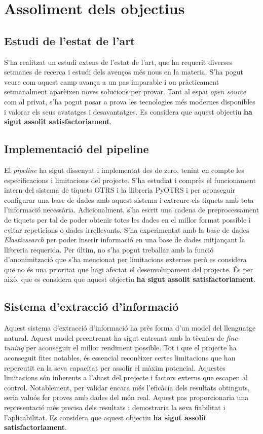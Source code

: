 \section{Assoliment dels objectius}

\subsection{Estudi de l'estat de l'art}
S'ha realitzat un estudi extens de l'estat de l'art, que ha requerit diverses setmanes de recerca i estudi dels avenços més nous en la materia. S'ha pogut veure com aquest camp avança a un pas imparable i on pràcticament setmanalment aparèixen noves solucions per provar. Tant al espai \textit{open source} com al privat, s'ha pogut posar a prova les tecnologies més modernes disponibles i valorar els seus avatatges i desavantatges. Es considera que aquest objectiu \textbf{ha sigut assolit satisfactoriament}.

\subsection{Implementació del pipeline}
El \textit{pipeline} ha sigut dissenyat i implementat des de zero, tenint en compte les especificacions i limitacions del projecte. S'ha estudiat i comprès el funcionament intern del sistema de tiquets OTRS i la llibreria PyOTRS i per aconseguir configurar una base de dades amb aquest sistema i extreure els tiquets amb tota l'informació necessària. Adicionalment, s'ha escrit una cadena de preprocessament de tiquets per tal de poder obtenir totes les dades en el millor format possible i evitar repeticions o dades irrellevants. S'ha experimentat amb la base de dades \textit{Elasticsearch} per poder inserir informació en una base de dades mitjançant la llibreria requerida. Per últim, no s'ha pogut treballar amb la funció d'anonimització que s'ha mencionat per limitacions externes però es considera que no és una prioritat que hagi afectat el desenvolupament del projecte. És per això, que es considera que aquest objectiu \textbf{ha sigut assolit satisfactoriament}.

\subsection{Sistema d'extracció d'informació}
Aquest sistema d'extracció d'informació ha près forma d'un model del llenguatge natural. Aquest model preentrenat ha sigut entrenat amb la tècnica de \textit{fine-tuning} per aconseguir el millor rendiment possible. Tot i que el projecte ha aconseguit fites notables, és essencial reconèixer certes limitacions que han repercutit en la seva capacitat per assolir el màxim potencial. Aquestes limitacions són inherents a l'abast del projecte i factors externs que escapen al control. Notablement, per validar encara més l'eficàcia dels resultats obtinguts, seria valuós fer proves amb dades del món real. Aquest pas proporcionaria una representació més precisa dels resultats i demostraria la seva fiabilitat i l'aplicabilitat. Es considera que aquest objectiu \textbf{ha sigut assolit satisfactoriament}.

